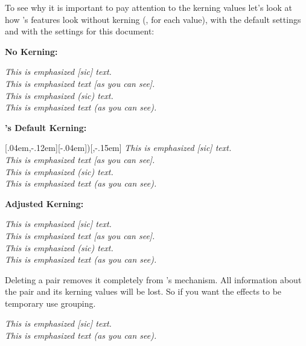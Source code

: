 \documentclass[DIV10,toc=index,toc=bib]{cnpkgdoc}
\begin{document}
To see why it is important to pay attention to the kerning values let's look at
how \embrac's features look without kerning (\ie, \code{0pt} for each value),
with the default settings and with the settings for this document:

\begin{center}
 \begin{minipage}{.5\linewidth}
  \textbf{No Kerning:}
  
  \RenewEmph{[}{]}\RenewEmph{(}{)}
  \emph{This is emphasized [sic] text.} \\
  \emph{This is emphasized text [as you can see].} \\
  \emph{This is emphasized (sic) text.} \\
  \emph{This is emphasized text (as you can see).}
 \end{minipage}\bigskip
 
 \begin{minipage}{.5\linewidth}
  \textbf{\embrac's Default Kerning:}
  
  \RenewEmph{[}{]}[.04em,-.12em]\RenewEmph{(}[-.04em]{)}[,-.15em]
  \emph{This is emphasized [sic] text.} \\
  \emph{This is emphasized text [as you can see].} \\
  \emph{This is emphasized (sic) text.} \\
  \emph{This is emphasized text (as you can see).}
 \end{minipage}\bigskip
 
 \begin{minipage}{.5\linewidth}
  \textbf{Adjusted Kerning:}
  
  \emph{This is emphasized [sic] text.} \\
  \emph{This is emphasized text [as you can see].} \\
  \emph{This is emphasized (sic) text.} \\
  \emph{This is emphasized text (as you can see).}
 \end{minipage}
\end{center}

Deleting a pair removes it completely from \embrac's mechanism. All information
about the pair and its kerning values will be lost. So if you want the effects
to be temporary use grouping.
\begin{beispiel}
 \DeleteEmph{[}{]}
 \emph{This is emphasized [sic] text.} \\
 \emph{This is emphasized text (as you can see).}
\end{beispiel}
\end{document}

